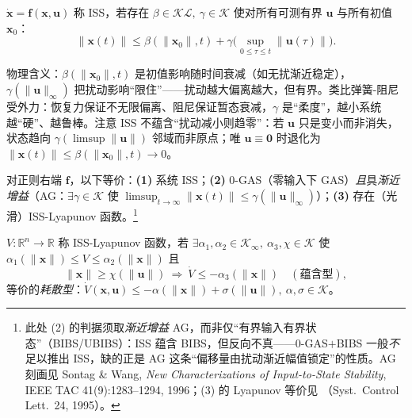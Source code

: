 \begin{definition}
\label{def:lyap-iss}
$\dot{\mathbf{x}}=\mathbf{f}(\mathbf{x},\mathbf{u})$ 称 ISS，若存在 $\beta\in\mathcal{KL},\ \gamma\in\mathcal{K}$ 使对所有可测有界 $\mathbf{u}$ 与所有初值 $\mathbf{x}_0$：
\begin{equation}
  \|\mathbf{x}(t)\|\le\beta(\|\mathbf{x}_0\|,t)+\gamma\Big(\sup_{0\le\tau\le t}\|\mathbf{u}(\tau)\|\Big).
  \label{eq:lyap-iss-def}
\end{equation}
\end{definition}

\noindent 物理含义：$\beta(\|\mathbf{x}_0\|,t)$ 是初值影响随时间衰减（如无扰渐近稳定），$\gamma(\|\mathbf{u}\|_\infty)$ 把扰动影响“限住”——扰动越大偏离越大，但有界。类比弹簧-阻尼受外力：恢复力保证不无限偏离、阻尼保证暂态衰减，$\gamma$ 是“柔度”，越小系统越“硬”、越鲁棒。注意 ISS 不蕴含“扰动减小则趋零”：若 $\mathbf{u}$ 只是变小而非消失，状态趋向 $\gamma(\limsup\|\mathbf{u}\|)$ 邻域而非原点；唯 $\mathbf{u}\equiv\mathbf{0}$ 时退化为 $\|\mathbf{x}(t)\|\le\beta(\|\mathbf{x}_0\|,t)\to0$。

\begin{theorem}
\label{thm:lyap-iss-char}
对正则右端 $\mathbf{f}$，以下等价：\textbf{(1)} 系统 ISS；\textbf{(2)} 0-GAS（零输入下 GAS）\emph{且}具\emph{渐近增益}（AG：$\exists\gamma\in\mathcal{K}$ 使 $\limsup_{t\to\infty}\|\mathbf{x}(t)\|\le\gamma(\|\mathbf{u}\|_\infty)$）；\textbf{(3)} 存在（光滑）ISS-Lyapunov 函数\cite{sontagwang1995characterizations}。\footnote{此处 (2) 的判据须取\emph{渐近增益} AG，而非仅“有界输入有界状态”（BIBS/UBIBS）：ISS 蕴含 BIBS，但反向不真——0-GAS$+$BIBS 一般\emph{不}足以推出 ISS，缺的正是 AG 这条“偏移量由扰动渐近幅值锁定”的性质。AG 刻画见 Sontag \& Wang, \emph{New Characterizations of Input-to-State Stability}, IEEE TAC 41(9):1283–1294, 1996；(3) 的 Lyapunov 等价见 \cite{sontagwang1995characterizations}（Syst.\ Control Lett.\ 24, 1995）。}
\end{theorem}

\begin{definition}
\label{def:lyap-iss-lyap}
$V:\mathbb{R}^n\to\mathbb{R}$ 称 ISS-Lyapunov 函数，若 $\exists\alpha_1,\alpha_2\in\mathcal{K}_\infty,\ \alpha_3,\chi\in\mathcal{K}$ 使 $\alpha_1(\|\mathbf{x}\|)\le V\le\alpha_2(\|\mathbf{x}\|)$ 且
\begin{equation}
  \|\mathbf{x}\|\ge\chi(\|\mathbf{u}\|)\ \Rightarrow\ \dot V\le-\alpha_3(\|\mathbf{x}\|)\quad(\text{蕴含型}),
  \label{eq:lyap-iss-implication}
\end{equation}
等价的\emph{耗散型}：$\dot V(\mathbf{x},\mathbf{u})\le-\alpha(\|\mathbf{x}\|)+\sigma(\|\mathbf{u}\|),\ \alpha,\sigma\in\mathcal{K}$。
\end{definition}

